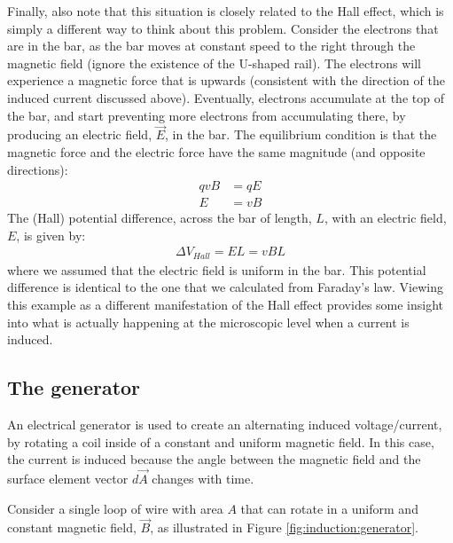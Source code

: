 Finally, also note that this situation is closely related to the Hall effect, which is simply a different way to think about this problem. Consider the electrons that are in the bar, as the bar moves at constant speed to the right through the magnetic field (ignore the existence of the U-shaped rail). The electrons will experience a magnetic force that is upwards (consistent with the direction of the induced current discussed above). Eventually, electrons accumulate at the top of the bar, and start preventing more electrons from accumulating there, by producing an electric field, $\vec E$, in the bar. The equilibrium condition is that the magnetic force and the electric force have the same magnitude (and opposite directions):
\begin{align*}
qvB &= qE\\
E &= vB
\end{align*}
The (Hall) potential difference, across the bar of length, $L$, with an electric field, $E$, is given by:
\begin{align*}
\Delta V_{Hall} = EL = vBL
\end{align*}
where we assumed that the electric field is uniform in the bar. This potential difference is identical to the one that we calculated from Faraday's law. Viewing this example as a different manifestation of the Hall effect provides some insight into what is actually happening at the microscopic level when a current is induced. 


\subsection{The generator}
An electrical generator is used to create an alternating induced voltage/current, by rotating a coil inside of a constant and uniform magnetic field. In this case, the current is induced because the angle between the magnetic field and the surface element vector $d\vec A$ changes with time.

Consider a single loop of wire with area $A$ that can rotate in a uniform and constant magnetic field, $\vec B$, as illustrated in Figure \ref{fig:induction:generator}. 

